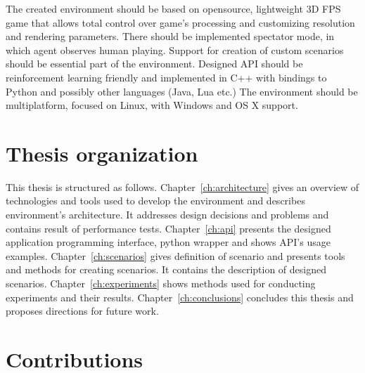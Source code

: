 The created environment should be based on opensource, lightweight 3D FPS game that allows total control over game's processing and customizing resolution and rendering parameters.
There should be implemented spectator mode, in which agent observes human playing.
Support for creation of custom scenarios should be essential part of the environment. 
Designed API should be reinforcement learning friendly and implemented in C++ with bindings to Python and possibly other languages (Java, Lua etc.)
The environment should be multiplatform, focused on Linux, with Windows and OS X support.
	
\section{Thesis organization}


This thesis is structured as follows. 
Chapter~\ref{ch:architecture} gives an overview of technologies and tools used to develop the environment and describes environment's architecture. It addresses design decisions and problems and contains result of performance tests. 
Chapter~\ref{ch:api} presents the designed application programming interface, python wrapper and shows API's usage examples. 
Chapter~\ref{ch:scenarios} gives definition of scenario and presents tools and methods for creating scenarios. It contains the description of designed scenarios. 
Chapter~\ref{ch:experiments} shows methods used for conducting experiments and their results. 
Chapter~\ref{ch:conclusions} concludes this thesis and proposes directions for future work.

\section{Contributions}
